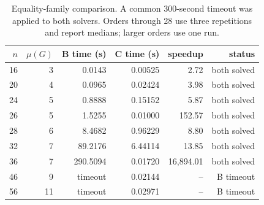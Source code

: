 \begin{table}[t]
\centering
\caption{Equality-family comparison. A common 300-second timeout was applied to both solvers. Orders through 28 use three repetitions and report medians; larger orders use one run.}
\label{tab:solver-bc-equality}
\small
\begin{tabular}{rrrrrr}
\toprule
$n$ & $\mu(G)$ & B time (s) & C time (s) & speedup & status \\
\midrule
16 & 3  & 0.0143 & 0.00525 & 2.72 & both solved \\
20 & 4  & 0.0965 & 0.02424 & 3.98 & both solved \\
24 & 5  & 0.8888 & 0.15152 & 5.87 & both solved \\
26 & 5  & 1.5255 & 0.01000 & 152.57 & both solved \\
28 & 6  & 8.4682 & 0.96229 & 8.80 & both solved \\
32 & 7  & 89.2176 & 6.44114 & 13.85 & both solved \\
36 & 7  & 290.5094 & 0.01720 & 16,894.01 & both solved \\
46 & 9  & timeout & 0.02144 & -- & B timeout \\
56 & 11 & timeout & 0.02971 & -- & B timeout \\
\bottomrule
\end{tabular}
\end{table}
